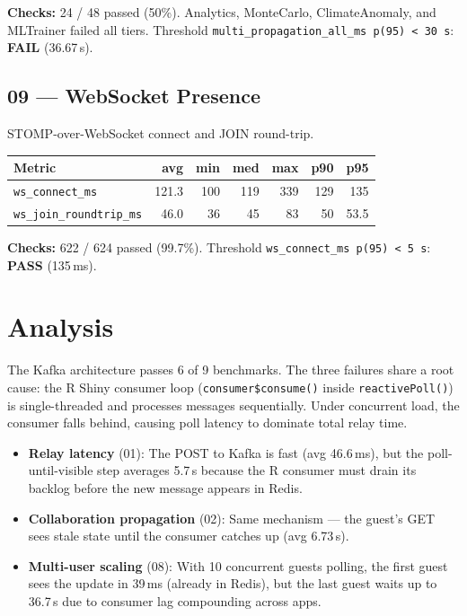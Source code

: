 \documentclass[11pt,a4paper]{article}
\newcommand{\pass}{\textcolor{pass}{\textbf{PASS}}}
\newcommand{\fail}{\textcolor{fail}{\textbf{FAIL}}}
\begin{document}
\medskip
\noindent\textbf{Checks:} 24 / 48 passed (50\%).
Analytics, MonteCarlo, ClimateAnomaly, and MLTrainer failed all tiers.
Threshold \texttt{multi\_propagation\_all\_ms p(95) < 30\,s}: \fail{} (36.67\,s).

\subsection{09 — WebSocket Presence}

STOMP-over-WebSocket connect and JOIN round-trip.

\begin{tabular}{@{}lrrrrrr@{}}
\toprule
\textbf{Metric} & \textbf{avg} & \textbf{min} & \textbf{med} & \textbf{max} & \textbf{p90} & \textbf{p95} \\
\midrule
\texttt{ws\_connect\_ms}        & 121.3 & 100 & 119 & 339 & 129 & 135 \\
\texttt{ws\_join\_roundtrip\_ms} & 46.0  & 36  & 45  & 83  & 50  & 53.5 \\
\bottomrule
\end{tabular}

\medskip
\noindent\textbf{Checks:} 622 / 624 passed (99.7\%).
Threshold \texttt{ws\_connect\_ms p(95) < 5\,s}: \pass{} (135\,ms).

\section{Analysis}

The Kafka architecture passes 6 of 9 benchmarks. The three failures share a root cause:
the R Shiny consumer loop (\texttt{consumer\$consume()} inside \texttt{reactivePoll()})
is single-threaded and processes messages sequentially. Under concurrent load, the consumer
falls behind, causing poll latency to dominate total relay time.

\begin{itemize}
  \item \textbf{Relay latency} (01): The POST to Kafka is fast (avg 46.6\,ms), but the
        poll-until-visible step averages 5.7\,s because the R consumer must drain its
        backlog before the new message appears in Redis.
  \item \textbf{Collaboration propagation} (02): Same mechanism — the guest's GET sees
        stale state until the consumer catches up (avg 6.73\,s).
  \item \textbf{Multi-user scaling} (08): With 10 concurrent guests polling, the first
        guest sees the update in 39\,ms (already in Redis), but the last guest waits
        up to 36.7\,s due to consumer lag compounding across apps.
\end{itemize}
\end{document}
